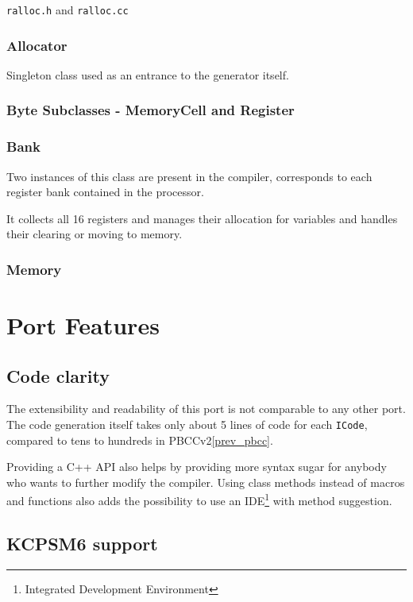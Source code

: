     \texttt{ralloc.h} and \texttt{ralloc.cc}

        \subsection{Allocator}

        Singleton class used as an entrance to the generator itself.

        \subsection{Byte Subclasses - MemoryCell and Register}

        \subsection{Bank}

        Two instances of this class are present in the compiler, corresponds to each register bank contained in the processor.

        It collects all 16 registers and manages their allocation for variables and handles their clearing or moving to memory.

        \subsection{Memory}


\chapter{Port Features}\label{features}

    \section{Code clarity}

    The extensibility and readability of this port is not comparable to any other port. The code generation itself takes only about 5 lines of code for each \texttt{ICode}, compared to tens to hundreds in PBCCv2\ref{prev_pbcc}.

    Providing a C++ API also helps by providing more syntax sugar for anybody who wants to further modify the compiler. Using class methods instead of macros and functions also adds the possibility to use an IDE\footnote{Integrated Development Environment} with method suggestion.

    \section{KCPSM6 support}

